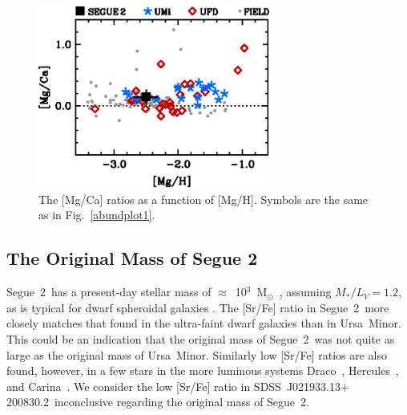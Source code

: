 \documentclass[useAMS,usenatbib,usegraphicx]{mn2e}
\def\msun{\mbox{M$_{\odot}$}}
\def\seg{\mbox{SDSS~J021933.13$+$200830.2}}
\def\seggal{\mbox{Segue~2}}
\def\umigal{\mbox{Ursa Minor}}
\def\hergal{\mbox{Hercules}}
\def\dragal{\mbox{Draco}}
\def\cargal{\mbox{Carina}}
\begin{document}
\begin{figure}
\begin{center}
\includegraphics[angle=00,width=3.0in]{fig7.eps}
\end{center}
\caption{
\label{abundplot5}
The [Mg/Ca] ratios as a function of [Mg/H].
Symbols are the same as in Fig.~\ref{abundplot1}.
}
\end{figure}


\subsection{The Original Mass of Segue 2}
\label{originalmass}


\seggal\ has a present-day stellar mass of $\approx$~10$^{3}$~\msun\
\citep{kirby13},
assuming $M_*/L_V = 1.2$, 
as is typical for dwarf spheroidal galaxies \citep{woo08}.
The [Sr/Fe] ratio in \seggal\
more closely matches that found in the ultra-faint dwarf galaxies
than in \umigal.
This could be an indication that the original mass of \seggal\ 
was not quite as large as the original mass of \umigal.
Similarly low [Sr/Fe] ratios are also found, however, in 
a few stars in the more luminous systems
\dragal\ \citep{fulbright04}, 
\hergal\ \citep{koch08}, and
\cargal\ \citep{venn12}.
We consider the low [Sr/Fe] ratio in \seg\
inconclusive regarding the original mass of \seggal.
\end{document}
